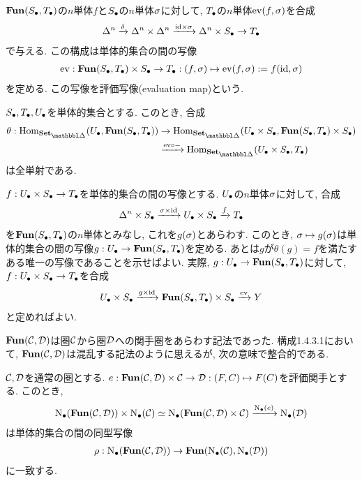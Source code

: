 \documentclass[uplatex, a4paper, 14Q, dvipdfmx]{jsreport}
\begin{document}
$\fun(\S,\T)$の$n$単体$f$と$\S$の$n$単体$\si$に対して, $\T$の$n$単体$\eva(f,\si)$を合成
\begin{align*}
  \Delta^n \xr{\delta} \Delta^n \ti \Delta^n \xr{\id \ti \si} \Delta^n \ti \S \to \T
\end{align*}
で与える. 
この構成は単体的集合の間の写像
\begin{align*}
  \eva: \fun(\S,\T) \ti \S \to \T : (f,\si) \mt \eva(f,\si):=f(\id,\si)
\end{align*}
を定める. 
この写像を評価写像(evaluation map)という.

\begin{prop}
  $\S,\T,\U$を単体的集合とする. 
  このとき, 合成
  \begin{align*}
    \theta: \Hom_{\sset}(\U,\fun(\S,\T)) 
    &\to \Hom_{\sset}(\U \ti \S, \fun(\S,\T) \ti \S) \\
    &\xr{\eva \ci -} \Hom_{\sset}(\U \ti \S, \T) 
  \end{align*}
  は全単射である. 
\end{prop}

\begin{Proof}
  $f: \U \ti \S \to \T$を単体的集合の間の写像とする.
  $\U$の$n$単体$\si$に対して, 合成 
  \begin{align*}
    \Delta^n \ti \S \xr{\si \ti \id} \U \ti \S \xr{f} \T
  \end{align*}
  を$\fun(\S,\T)$の$n$単体とみなし, これを$g(\si)$とあらわす. 
  このとき, $\si \mt g(\si)$は単体的集合の間の写像$g: \U \to \fun(\S,\T)$を定める. 
  あとは$g$が$\theta(g)=f$を満たすある唯一の写像であることを示せばよい. 
  実際, $g: \U \to \fun(\S,\T)$に対して, $f: \U \ti \S \to \T$を合成
  \begin{align*}
    \U \ti \S \xr{g \ti \id} \fun(\S,\T) \ti \S \xr{\eva} Y
  \end{align*}
  と定めればよい. 
\end{Proof}

$\fun(\calC,\calD)$は圏$\calC$から圏$\calD$への関手圏をあらわす記法であった. 
構成1.4.3.1において, $\fun(\calC,\calD)$は混乱する記法のように思えるが, 次の意味で整合的である.

\begin{prop}
  $\calC, \calD$を通常の圏とする. 
  $e: \fun(\calC,\calD) \ti \calC \to \calD: (F,C) \mt F(C)$を評価関手とする. 
  このとき, 
  \begin{align*}
    \N(\fun(\calC,\calD)) \ti \N(\calC)
    \simeq \N(\fun(\calC,\calD) \ti \calC) \xr{\N(e)} \N(\calD)
  \end{align*}
  は単体的集合の間の同型写像
  \begin{align*}
    \rho: \N(\fun(\calC,\calD)) \to \fun(\N(\calC),\N(\calD))
  \end{align*}
  に一致する. 
\end{prop}
\end{document}
